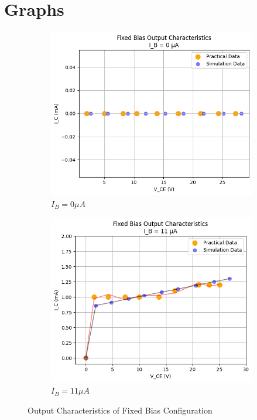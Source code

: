 \documentclass[12pt]{article}
\begin{document}
\newpage

\section{Graphs}
\begin{figure}[h!]
    \centering
    \begin{subfigure}{0.49\textwidth}
        \includegraphics[width=0.9\linewidth]{FB_0A.png}
        \caption{$I_B = 0\mu A$}
    \end{subfigure}
    \begin{subfigure}{0.49\textwidth}
        \includegraphics[width=0.9\linewidth]{FB_11A.png}
        \caption{$I_B = 11\mu A$}
    \end{subfigure}
    \caption{Output Characteristics of Fixed Bias Configuration}
    \label{Fixed Bias Graph}
\end{figure}
\end{document}
